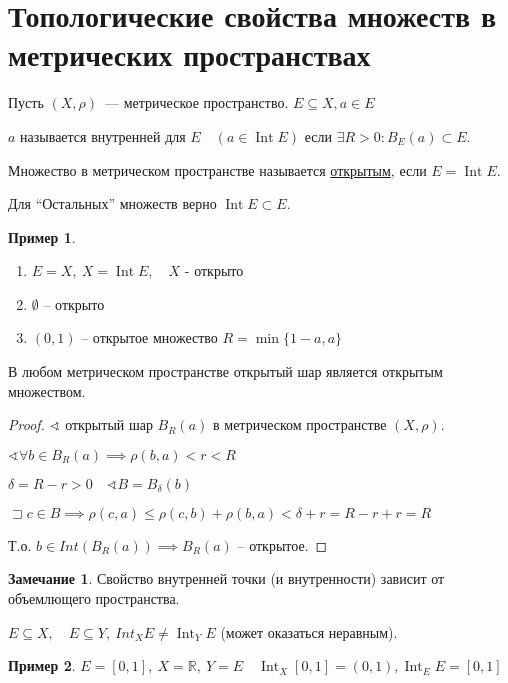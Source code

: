 \documentclass{book}
\newcommand\R{\ensuremath{\mathbb{R}}}
\renewcommand\O{\ensuremath{\emptyset}}
\DeclareMathOperator{\Int}{Int}
\theoremstyle{definition}
\newtheorem*{note}{Замечание}
\newtheorem*{example}{Пример}
\begin{document}
    \section{Топологические свойства множеств в метрических пространствах}

    \begin{definition}
        Пусть $\left( X, \rho \right)$~--- метрическое пространство. $E\subseteq X, a\in E$

        $a$ называется внутренней для  $E\quad (a\in \Int E)$ если $\exists R>0: B_E(a) \subset E$. 
    \end{definition}

    \begin{definition}
        Множество в метрическом пространстве называется \underline{открытым}, если $E = \Int E$.

        Для ``Остальных'' множеств верно $\Int E \subset E$.
    \end{definition}
    \begin{example}
        \begin{enumerate}
            \item $E = X,\ X = \Int E,\quad X$ - открыто
            \item $\O $ -- открыто
            \item $(0,1)$ -- открытое множество $ R = \min \{1-a, a\}$
    \end{enumerate}
    \end{example}

    \begin{statement}
        В любом метрическом пространстве открытый шар является открытым множеством.
    \end{statement}
    \begin{proof}
        $\sphericalangle$ открытый шар $B_R(a)$ в метрическом пространстве  $(X, \rho)$.

        $\sphericalangle \forall b\in B_R(a) \implies  \rho(b,a)<r<R$

        $\delta = R-r>0\quad \sphericalangle B = B_{\delta}(b)$

        $\sqsupset c\in B \implies  \rho(c,a) \leqslant \rho(c,b) + \rho(b,a) < \delta + r = R-r +r = R$

        Т.о. $b\in Int(B_R(a)) \implies  B_R(a)$ -- открытое.
    \end{proof}

    \begin{note}
        Свойство внутренней точки (и внутренности) зависит от объемлющего пространства. 

        $E\subseteq X,\quad E\subseteq Y,\ Int_X E \neq \Int_Y E$ (может оказаться неравным).
    \end{note}
    \begin{example}
        $E = [0,1],\ X=\R,\ Y = E\quad \Int_X [0,1] = (0,1), \Int_E E = [0,1]$
    \end{example}
\end{document}
